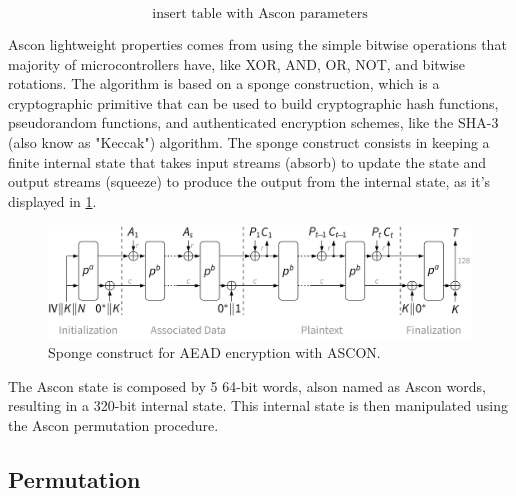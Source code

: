 \documentclass[11pt,twoside]{article}
\begin{document}
$$ \textrm{insert table with Ascon parameters} $$

Ascon lightweight properties comes from using the simple bitwise operations that majority of microcontrollers have, like XOR, AND, OR, NOT, and bitwise rotations. The algorithm is based on a sponge construction, which is a cryptographic primitive that can be used to build cryptographic hash functions, pseudorandom functions, and authenticated encryption schemes, like the SHA-3 (also know as "Keccak") \cite{bertoni2015keccak} algorithm. The sponge construct consists in keeping a finite internal state that takes input streams (absorb) to update the state and output streams (squeeze) to produce the output from the internal state, as it's displayed in \cref{fig:1}.

\begin{figure}[h]
  \centering
  \includegraphics[width=.64\textwidth]{assets/aead_encrypt.png}
  \caption{Sponge construct for AEAD encryption with ASCON.}
  \label{fig:1}
\end{figure}



The Ascon state is composed by 5 64-bit words, alson named as Ascon words, resulting in a 320-bit internal state. This internal state is then manipulated using the Ascon permutation procedure.



\subsection{Permutation}
\end{document}
